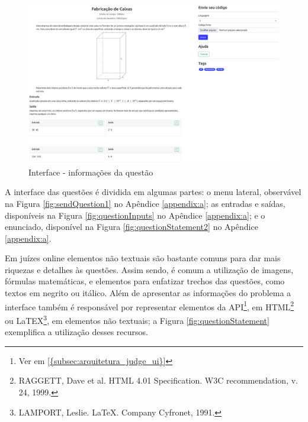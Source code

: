\begin{figure}[H]
    \centering
    \includegraphics[keepaspectratio=true,scale=0.2]{figuras/question3.eps}
    \caption{Interface - informações da questão}
    \label{fig:question3}
\end{figure}

A interface das questões é dividida em algumas partes: o menu lateral, observável na Figura \ref{fig:sendQuestion1} no Apêndice \ref{appendix:a}; as entradas e saídas, disponíveis na Figura \ref{fig:questionInputs} no Apêndice \ref{appendix:a}; e o enunciado, disponível na Figura \ref{fig:questionStatement2} no Apêndice \ref{appendix:a}.

Em juízes online elementos não textuais são bastante comuns para dar mais riquezas e detalhes às questões. Assim sendo, é comum a utilização de imagens, fórmulas matemáticas, e elementos para enfatizar trechos das questões, como textos em negrito ou itálico. Além de apresentar as informações do problema a interface também é responsável por representar elementos da API\footnote{Ver em \ref{{subsec:arquitetura_judge_ui}}}, em HTML\footnote{RAGGETT, Dave et al. HTML 4.01 Specification. W3C recommendation, v. 24, 1999.}  ou LaTEX\footnote{LAMPORT, Leslie. LaTeX. Company Cyfronet, 1991.}, em elementos não textuais; a Figura \ref{fig:questionStatement} exemplifica a utilização desses recursos.



